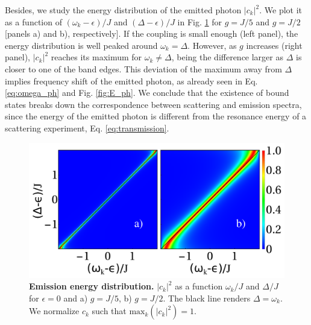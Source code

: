 \documentclass[aps,pra,twocolumn,floatfix,superscriptaddress]{revtex4-1}%
\begin{document}
Besides, we study the energy distribution of the emitted photon $|c_k|^2$. We plot it as a function of $(\omega_k-\epsilon)/J$ and $(\Delta-\epsilon)/J$ in Fig. \ref{fig:c_k} for $g=J/5$ and $g=J/2$ [panels a) and b), respectively]. If the coupling is small enough (left panel), the energy distribution is well peaked around $\omega_k=\Delta$. However, as $g$ increases (right panel), $|c_k|^2$ reaches its maximum for $\omega_k\neq\Delta$, being the difference larger as $\Delta$ is closer to one of the band edges. This deviation of the maximum away from $\Delta$ implies frequency shift of the emitted photon, as already seen in Eq. \eqref{eq:omega_ph} and Fig. \ref{fig:E_ph}. {\color{blue}We conclude that the existence of bound states breaks down the correspondence between scattering and emission spectra, since the energy of the emitted photon is different from the resonance energy of a scattering experiment, Eq. \eqref{eq:transmission}.}

\begin{figure}[thb!]
\includegraphics[width=1.0\columnwidth]{e_vs_w_Delta_g_0_2_0_5.pdf}
\caption{{\bf Emission energy distribution.} $|c_k|^2$ as a function $\omega_k/J$ and $\Delta/J$ for $\epsilon=0$ and a) $g=J/5$, b) $g=J/2$. The black line renders $\Delta=\omega_k$. We normalize $c_k$ such that $\text{max}_k(|c_k|^2)=1$.}\label{fig:c_k}
\end{figure}
\end{document}
